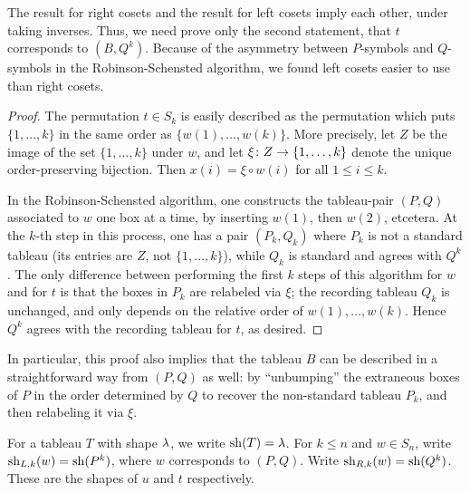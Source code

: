 \begin{remark} The result for right cosets and the result for left cosets imply each other, under taking inverses. Thus, we need prove only the second statement, that $t$ corresponds to
$(B,Q^k)$. Because of the asymmetry between $P$-symbols and $Q$-symbols in the Robinson-Schensted algorithm, we found left cosets easier to use than right cosets. \end{remark}

\begin{proof} The permutation $t \in S_k$ is easily described as the permutation which puts $\{1, \ldots, k\}$ in
the same order as $\{w(1), \ldots, w(k)\}$. More precisely, let $Z$ be the image of the set $\{1, \ldots, k\}$ under $w$, and let $\xi \colon Z \rightarrow \{1, \ldots, k\}$ denote the unique
order-preserving bijection. Then $x(i) = \xi \circ w(i)$ for all $1\leq i\leq k$.%

In the Robinson-Schensted algorithm, one constructs the tableau-pair $(P,Q)$ associated to $w$ one box at a time, by inserting $w(1)$, then $w(2)$, etcetera. At the $k$-th step in this
process, one has a pair $(P_k, Q_k)$ where $P_k$ is not a standard tableau (its entries are $Z$, not $\{1, \ldots, k\}$), while $Q_k$ is standard and agrees with $Q^k$. The only
difference between performing the first $k$ steps of this algorithm for $w$ and for $t$ is that the boxes in $P_k$ are relabeled via $\xi$; the recording tableau $Q_k$ is unchanged, and
only depends on the relative order of $w(1), \ldots, w(k)$. Hence $Q^k$ agrees with the recording tableau for $t$, as desired. \end{proof}

\begin{remark} In particular, this proof also implies that the tableau $B$ can be described in a straightforward way from $(P,Q)$ as well: by ``unbumping'' the extraneous boxes of $P$ in
the order determined by $Q$ to recover the non-standard tableau $P_k$, and then relabeling it via $\xi$. \end{remark}

\begin{notation} For a tableau $T$ with shape $\lambda$, we write $\operatorname{sh}(T) = \lambda$. For $k \le n$ and $w \in S_n$, write $\operatorname{sh}_{L,k}(w) = \operatorname{sh}(P^k)$, where $w$ corresponds to $(P,Q)$. Write $\operatorname{sh}_{R,k}(w) = \operatorname{sh}(Q^k)$. These are the shapes of $u$ and $t$ respectively. \end{notation}
	
